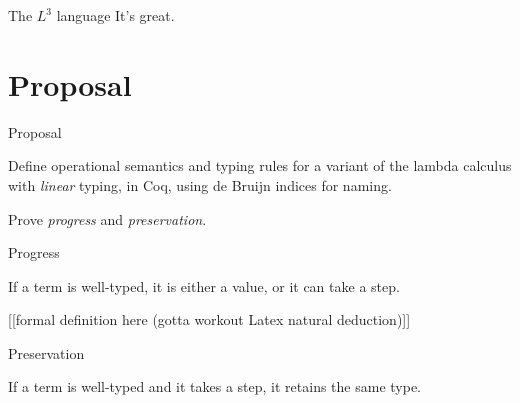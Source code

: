 \documentclass[10pt]{beamer}
\begin{document}
\begin{frame}{The \textbf{$L^3$} language}
It's great.
\end{frame}

\section{Proposal}

\begin{frame}{Proposal}

Define operational semantics and typing rules for a variant of the lambda calculus with \textit{linear} typing, in Coq, using de Bruijn indices for naming.

Prove \textit{progress} and \textit{preservation}.
\end{frame}

\begin{frame}{Progress}

If a term is well-typed, it is either a value, or it can take a step.

[[formal definition here (gotta workout Latex natural deduction)]]
\end{frame}

\begin{frame}{Preservation}

If a term is well-typed and it takes a step, it retains the same type.

\end{frame}
\end{document}

